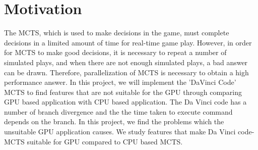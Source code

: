 
\section{Motivation}
The MCTS, which is used to make decisions in the game, must complete decisions in a limited amount of time for real-time game play. 
However, in order for MCTS to make good decisions, it is necessary to repeat a number of simulated plays, and when there are not enough simulated plays, a bad answer can be drawn. 
Therefore, parallelization of MCTS is necessary to obtain a high performance answer.
In this project, we will implement the 'DaVinci Code' MCTS to find features that are not suitable for the GPU through comparing GPU based application with CPU based application.
The Da Vinci code has a number of branch divergence and the the time taken to execute command depends on the branch.
In this project, we find the problems which the unsuitable GPU application causes.
We study features that make Da Vinci code-MCTS suitable for GPU compared to CPU based MCTS.
